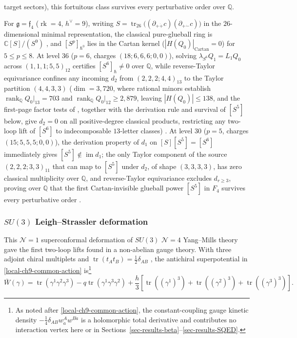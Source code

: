 \documentclass[11pt]{article}
\numberwithin{equation}{section}
\numberwithin{figure}{section}
\numberwithin{table}{section}
\newcommand{\HQ}{|H(Q_0)|}
\newcommand{\HQC}{|H(Q_0)|_{\mathrm{Cartan}}}
\begin{document}
target sectors), this fortuitous class survives every perturbative order over $\mathbb Q$.

For $\mathfrak g=\mathfrak f_4$ ($\operatorname{rk}=4$, $h^\vee=9$), writing $S=\operatorname{tr}_{26}\bigl((\partial_{+\dot+}c)(\partial_{+\dot-}c)\bigr)$ in the $26$-dimensional minimal representation, the classical pure-glueball ring is $\mathbb C[S]/(S^9)$ \cite{EtingofKac,CederwallFerretti,Kumar}, and $[S^p]_{\hbar^0}$ lies in the Cartan kernel ($\HQC=0$) for $5\le p\le8$. At level $36$ ($p=6$, charges $(18;6,6,6;0,0)$), solving $\lambda_{S^6}Q_1=L_1Q_0$ across $(1,1,1;5,5)_{12}$ certifies $[S^6]_{\hbar}\ne0$ over $\mathbb Q$, while reverse-Taylor equivariance confines any incoming $d_2$ from $(2,2,2;4,4)_{13}$ to the Taylor partition $(4,4,3,3)$ ($\dim=3{,}720$, where rational minors establish $\operatorname{rank}_{\mathbb Q}Q_0|_{13}=703$ and $\operatorname{rank}_{\mathbb Q}Q_0|_{12}\ge2{,}879$, leaving $\HQ\le138$, and the first-page factor tests of \cite{Repo}, together with the derivation rule and survival of $[S^5]$ below, give $d_2=0$ on all positive-degree classical products, restricting any two-loop lift of $[S^6]$ to indecomposable $13$-letter classes) \cite{Repo}. At level $30$ ($p=5$, charges $(15;5,5,5;0,0)$), the derivation property of $d_1$ on $[S][S^5]=[S^6]$ immediately gives $[S^5]\notin\operatorname{im}d_1$; the only Taylor component of the source $(2,2,2;3,3)_{11}$ that can map to $[S^5]$ under $d_2$, of shape $(3,3,3,3)$, has zero classical multiplicity over $\mathbb Q$, and reverse-Taylor equivariance excludes $d_{r\ge3}$, proving over $\mathbb Q$ that the first Cartan-invisible glueball power $[S^5]$ in $F_4$ survives every perturbative order \cite{Repo}.

\subsubsection{$SU(3)$ Leigh--Strassler deformation}\label{sec-results-LS}

This $\mathcal N=1$ superconformal deformation of $SU(3)$ $\mathcal N=4$ Yang--Mills theory \cite{LeighStrassler} gave the first two-loop lifts found in a non-abelian gauge theory. With three adjoint chiral multiplets and $\operatorname{tr}(t_At_B)=\tfrac12\delta_{AB}$ \cite[results report, \S6.1]{Repo}, the antichiral superpotential in \eqref{local-ch9-common-action} is\footnote{As noted after \eqref{local-ch9-common-action}, the constant-coupling gauge kinetic density $-\tfrac14\delta_{AB}w_{\dot a}^Aw^{B\dot a}$ is a holomorphic total derivative and contributes no interaction vertex here or in Sections~\ref{sec-results-beta}--\ref{sec-results-SQED}.}
\begin{equation}\label{local-ch9-ls-action}
\bar W(\gamma)=
\operatorname{tr}(\gamma^1\gamma^2\gamma^3)
-q\operatorname{tr}(\gamma^1\gamma^3\gamma^2)
+\frac h3\left[\operatorname{tr}((\gamma^1)^3)
+\operatorname{tr}((\gamma^2)^3)+\operatorname{tr}((\gamma^3)^3)\right].
\end{equation}
\end{document}
